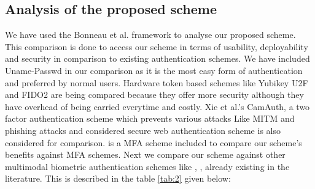 \documentclass[10pt,journal,compsoc]{IEEEtran}
\begin{document}
\subsection{Analysis of the proposed scheme}
We have used the Bonneau et al. framework \cite{IEEEtran64} to analyse our proposed scheme. This comparison is done to access our scheme in terms of usability, deployability and security in comparison to existing authentication schemes. 
We have included Uname-Passwd in our comparison as it is the most easy form of authentication and preferred by normal users. Hardware token based schemes like Yubikey U2F and FIDO2 are being compared because they offer more security although they have overhead of being carried everytime and costly. Xie et al.'s CamAuth, a two factor authentication scheme which prevents various attacks Like MITM and phishing attacks and considered secure web authentication scheme is also considered for comparison. \cite{IEEEtran30} is a MFA scheme included to compare our scheme's benefits against MFA schemes. Next we compare our scheme against other multimodal biometric authentication schemes like \cite{IEEEtran63}, \cite{r1}, \cite{r4} already existing in the literature. This is described in the table \ref{tab:2} given below:
\end{document}
